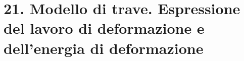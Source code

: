 \section{21. Modello di trave. Espressione del lavoro di deformazione e dell'energia di deformazione}


